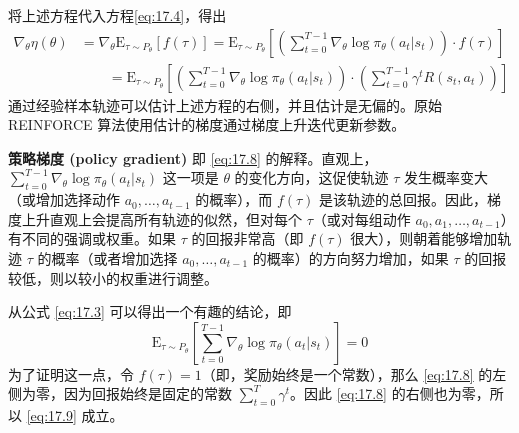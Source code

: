 将上述方程代入方程\eqref{eq:17.4}，得出
\begin{align}
    \nabla_\theta \eta(\theta) &= \nabla_\theta \mathrm{E}_{\tau \sim P_\theta} [f(\tau)] = \mathrm{E}_{\tau \sim P_\theta} \left[ \left( \sum_{t=0}^{T-1} \nabla_\theta \log \pi_\theta(a_t|s_t) \right) \cdot f(\tau) \right] \nonumber \\
    &\qquad= \mathrm{E}_{\tau \sim P_\theta} \left[ \left( \sum_{t=0}^{T-1} \nabla_\theta \log \pi_\theta(a_t|s_t) \right) \cdot \left( \sum_{t=0}^{T-1} \gamma^t R(s_t, a_t) \right) \right] \label{eq:17.8}
\end{align}
通过经验样本轨迹可以估计上述方程的右侧，并且估计是无偏的。原始 REINFORCE 算法使用估计的梯度通过梯度上升迭代更新参数。

\noindent\textbf{策略梯度 (policy gradient)} 即 \eqref{eq:17.8} 的解释。直观上，$\sum_{t=0}^{T-1} \nabla_\theta \log \pi_\theta(a_t|s_t)$ 这一项是 $\theta$ 的变化方向，这促使轨迹 $\tau$ 发生概率变大（或增加选择动作 $a_0, \dots, a_{t-1}$ 的概率），而 $f(\tau)$ 是该轨迹的总回报。因此，梯度上升直观上会提高所有轨迹的似然，但对每个 $\tau$（或对每组动作 $a_0, a_1, \dots, a_{t-1}$）有不同的强调或权重。如果 $\tau$ 的回报非常高（即 $f(\tau)$ 很大），则朝着能够增加轨迹 $\tau$ 的概率（或者增加选择 $a_0, \dots, a_{t-1}$ 的概率）的方向努力增加，如果 $\tau$ 的回报较低，则以较小的权重进行调整。

从公式 \eqref{eq:17.3} 可以得出一个有趣的结论，即
\begin{equation} \label{eq:17.9}
    \mathrm{E}_{\tau \sim P_\theta} \left[ \sum_{t=0}^{T-1} \nabla_\theta \log \pi_\theta(a_t|s_t) \right] = 0
\end{equation}
为了证明这一点，令 $f(\tau) = 1$（即，奖励始终是一个常数），那么 \eqref{eq:17.8} 的左侧为零，因为回报始终是固定的常数 $\sum_{t=0}^T \gamma^t$。因此 \eqref{eq:17.8} 的右侧也为零，所以 \eqref{eq:17.9} 成立。

